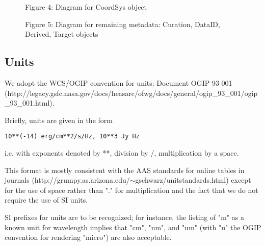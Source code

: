 \documentclass[11pt]{article}
\begin{document}
\begin{figure}[h]


\colorbox{iblue}{
}
{
\colorbox{iblue}{
\begin{minipage}{6.0in}
Figure 4: Diagram for CoordSys object

\end{minipage}
}
}
\end{figure}


\begin{figure}[h]

\colorbox{iblue}{
}
{
\colorbox{iblue}{
\begin{minipage}{6.0in}
Figure 5:  Diagram for remaining metadata:
Curation, DataID, Derived, Target objects 

\end{minipage}
}
}
\end{figure}





\clearpage

\subsection{Units}

We adopt the WCS/OGIP convention for units: 
Document OGIP 93-001 \\
(http://legacy.gsfc.nasa.gov/docs/heasarc/ofwg/docs/general/ogip\_93\_001/ogip\_93\_001.html).

Briefly, units are given in the form
\begin{verbatim}
10**(-14) erg/cm**2/s/Hz, 10**3 Jy Hz
\end{verbatim}

i.e. with exponents denoted by **, division by /, multiplication by a space.

This format is mostly consistent with the 
AAS standards for online tables in journals
(http://grumpy.as.arizona.edu/$\sim$gschwarz/unitstandards.html)
except for the use of space rather than "." for multiplication and the 
fact that we do not require the use of SI units.

SI prefixes for units are to be recognized; for instance, the listing of
"m" as a known unit for wavelength implies that "cm", "nm", and "um" (with
"u" the OGIP convention for rendering "micro") are also acceptable.
\end{document}
